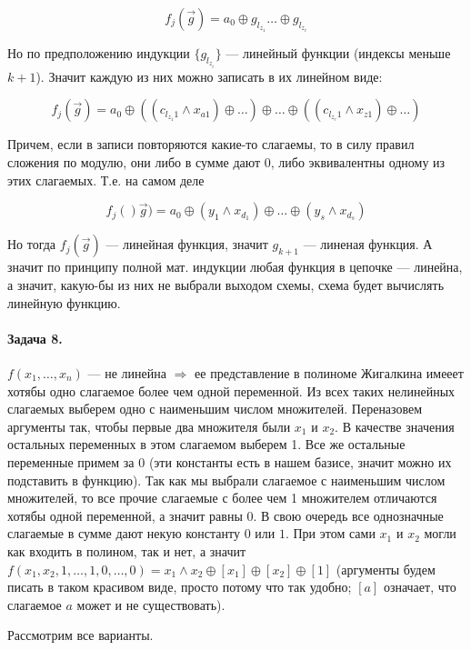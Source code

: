 \documentclass{article}
\begin{document}
        $$f_j(\vec{g}) = a_0 \oplus g_{l_{z_1}} \ldots \oplus g_{l_{z_c}} $$

    Но по предположению индукции $\{g_{l_{z_i}}\}$ --- линейный функции (индексы меньше $k + 1$). Значит каждую из них можно записать в их линейном виде:

        $$f_j(\vec{g}) = a_0 \oplus ((c_{l_{z_1}1} \wedge x_{a1}) \oplus \ldots) \oplus 
                      \ldots \oplus ((c_{l_{z_c}1} \wedge x_{z1}) \oplus \ldots) $$

    Причем, если в записи повторяются какие-то слагаемы, то в силу правил сложения по модулю, они либо в сумме дают 0, либо эквивалентны одному из этих слагаемых. Т.е. на самом деле 

    $$ f_j()\vec{g}) = a_0 \oplus (y_1 \wedge x_{d_1}) \oplus \ldots \oplus (y_s \wedge x_{d_s}) $$

    Но тогда $f_j(\vec{g})$ --- линейная функция, значит $g_{k + 1}$ --- линеная функция. А значит по принципу полной мат. индукции любая функция в цепочке --- линейна, а значит, какую-бы из них не выбрали выходом схемы, схема будет вычислять линейную функцию.

    \paragraph{Задача 8.}
    $f(x_1, \ldots, x_n)$ --- не линейна $\Rightarrow$ ее представление в полиноме Жигалкина имееет хотябы одно слагаемое более чем одной переменной. Из всех таких нелинейных слагаемых выберем одно с наименьшим числом множителей. Переназовем аргументы так, чтобы первые два множителя были $x_1$ и $x_2$. В качестве значения остальных переменных в этом слагаемом выберем 1. Все же остальные переменные примем за 0 (эти константы есть в нашем базисе, значит можно их подставить в функцию). Так как мы выбрали слагаемое с наименьшим числом множителей, то все прочие слагаемые с более чем 1 множителем отличаются хотябы одной переменной, а значит равны 0. В свою очередь все однозначные слагаемые в сумме дают некую константу $0$ или $1$. При этом сами $x_1$ и $x_2$ могли как входить в полином, так и нет, а значит $f(x_1, x_2, 1, \ldots , 1, 0 , \ldots , 0) = x_1\wedge x_2\oplus [x_1] \oplus [x_2] \oplus [1]$ (аргументы будем писать в таком красивом виде, просто потому что так удобно; $[a]$ означает, что слагаемое $a$ может и не существовать).

    Рассмотрим все варианты.
\end{document}
